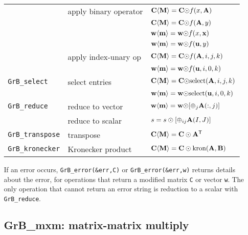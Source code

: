 \documentclass[12pt]{article}
\begin{document}
{\begin{tabular}{lll}
                     & apply binary operator   & ${\bf C \langle M \rangle = C \odot} f(x,{\bf A})$ \\
                     &                         & ${\bf C \langle M \rangle = C \odot} f({\bf A},y)$ \\
                     &                         & ${\bf w \langle m \rangle = w \odot} f(x,{\bf x})$ \\
                     &                         & ${\bf w \langle m \rangle = w \odot} f({\bf u},y)$ \\
                     & apply index-unary op    & ${\bf C \langle M \rangle = C \odot} f({\bf A},i,j,k)$ \\
                     &                         & ${\bf w \langle m \rangle = w \odot} f({\bf u},i,0,k)$ \\
\hline
\verb'GrB_select'    & select entries          & ${\bf C \langle M \rangle = C \odot} \mbox{select}({\bf A},i,j,k)$ \\
                     &                         & ${\bf w \langle m \rangle = w \odot} \mbox{select}({\bf u},i,0,k)$ \\
\hline
\verb'GrB_reduce'    & reduce to vector        & ${\bf w \langle m \rangle = w \odot} [{\oplus}_j {\bf A}(:,j)]$ \\
                     & reduce to scalar        & $s = s \odot [{\oplus}_{ij}  {\bf A}(I,J)]$ \\
\hline
\verb'GrB_transpose' & transpose               & ${\bf C \langle M \rangle = C \odot A^{\sf T}}$ \\
\hline
\verb'GrB_kronecker' & Kronecker product       & ${\bf C \langle M \rangle = C \odot \mbox{kron}(A, B)}$ \\
\hline
\end{tabular}
}
\vspace{0.2in}

If an error occurs, \verb'GrB_error(&err,C)' or \verb'GrB_error(&err,w)'
returns details about the error, for operations that return a modified matrix
\verb'C' or vector \verb'w'.  The only operation that cannot return an error
string is reduction to a scalar with \verb'GrB_reduce'.

\newpage
\subsection{{\sf GrB\_mxm:} matrix-matrix multiply} %
\label{mxm}
\end{document}
